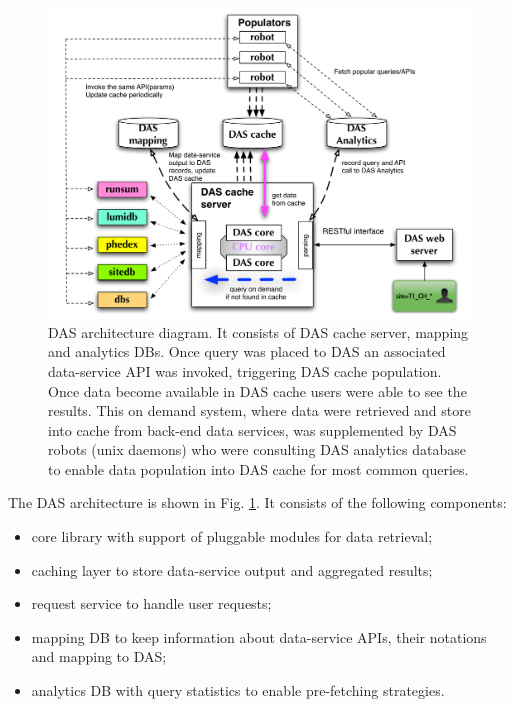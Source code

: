 \documentclass[a4paper]{jpconf}
\begin{document}
\begin{figure}[htb]
\centering
\includegraphics[width=150mm]{DAS_Cache_and_Analytics.pdf}
\caption{
DAS architecture diagram. It consists of DAS cache server, mapping and analytics DBs.
Once query was placed to DAS an associated
data-service API was invoked, triggering DAS cache population. Once data become
available in DAS cache users were able to see the results. This on demand
system, where data were retrieved and store into cache from
back-end data services, was supplemented by DAS robots (unix daemons) who
were consulting DAS analytics database to enable data population into DAS
cache for most common queries.
}
\label{DAS_cache}
\end{figure}

\noindent
The DAS architecture is shown in Fig. \ref{DAS_cache}. It consists of the
following components:
\begin{itemize}
\item core library with support of pluggable modules for data retrieval;
\item caching layer to store data-service output and aggregated results;
\item request service to handle user requests;
\item mapping DB to keep information about data-service APIs, their
notations and mapping to DAS;
\item analytics DB with query statistics to enable pre-fetching 
strategies.
\end{itemize}
\end{document}
